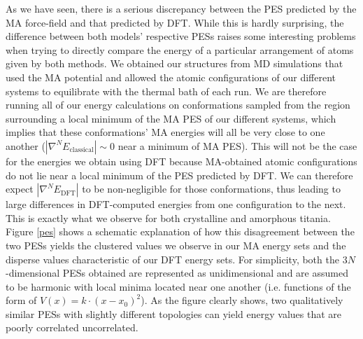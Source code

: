 \documentclass[aps,prb,twocolumn,amsmath,amssymb,superscriptaddress,longbibliography]{revtex4-1}
\newcommand\tab[1][1cm]{\hspace*{#1}} %
\begin{document}
\tab As we have seen, there is a serious discrepancy between the PES predicted by the MA force-field and that predicted by DFT.
While this is hardly surprising, the difference between both models' respective PESs raises some interesting problems when trying to directly compare the energy of a particular arrangement of atoms given by both methods. 
We obtained our structures from MD simulations that used the MA potential and allowed the atomic configurations of our different systems to equilibrate with the thermal bath of each run.
We are therefore running all of our energy calculations on conformations sampled from the region surrounding a local minimum of the MA PES of our different systems, which implies that these conformations' MA energies will all be very close to one another ($|\nabla^N E_{\text{classical}}|\sim 0$ near a minimum of MA PES).
This will not be the case for the energies we obtain using DFT because MA-obtained atomic configurations do not lie near a local minimum of the PES predicted by DFT.
We can therefore expect $|\nabla^N E_{\text{DFT}}|$ to be non-negligible for those conformations, thus leading to large differences in DFT-computed energies from one configuration to the next.
This is exactly what we observe for both crystalline and amorphous titania.
Figure \ref{pes} shows a schematic explanation of how this disagreement between the two PESs yields the clustered values we observe in our MA energy sets and the disperse values characteristic of our DFT energy sets.
For simplicity, both the $3N$-dimensional PESs obtained are represented as unidimensional and are assumed to be harmonic with local minima located near one another (i.e. functions of the form of $V(x) = k\cdot (x-x_0)^2$).
As the figure clearly shows, two qualitatively similar PESs with slightly different topologies can yield energy values that are poorly correlated uncorrelated.
\end{document}
